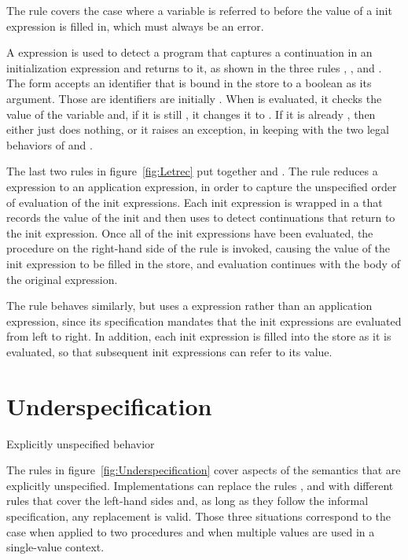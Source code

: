 The  rule covers the case where a variable is referred to before the value of a init expression is filled in, which must always be an error.

A  expression is used to detect a program that captures a continuation in an initialization expression and returns to it, as shown in the three rules , , and . The  form accepts an identifier that is bound in the store to a boolean as its argument. Those are identifiers are initially \semfalse{}. When  is evaluated, it checks the value of the variable and, if it is still \semfalse{}, it changes it to \semtrue{}. If it is already \semtrue{}, then  either just does nothing, or it raises an exception, in keeping with the two legal behaviors of  and . 

The last two rules in figure~\ref{fig:Letrec} put together  and . The  rule reduces a  expression to an application expression, in order to capture the unspecified order of evaluation of the init expressions. Each init expression is wrapped in a  that records the value of the init and then uses  to detect continuations that return to the init expression. Once all of the init expressions have been evaluated, the procedure on the right-hand side of the rule is invoked, causing the value of the init expression to be filled in the store, and evaluation continues with the body of the original  expression.

The  rule behaves similarly, but uses a  expression rather than an application expression, since its specification mandates that the init expressions are evaluated from left to right. In addition, each init expression is filled into the store as it is evaluated, so that subsequent init expressions can refer to its value.

\section{Underspecification}\label{sec:semantics:underspecification}

\beginfig
\begin{center}

\end{center}
\caption{Explicitly unspecified behavior}\label{fig:Underspecification}
\endfig

The rules in figure~\ref{fig:Underspecification} cover aspects of the
semantics that are explicitly unspecified. Implementations can replace
the rules ,  and with different rules that cover the left-hand sides and, as long as they follow the informal specification, any replacement is valid. Those three situations correspond to the case when  applied to two procedures and when multiple values are used in a single-value context.

